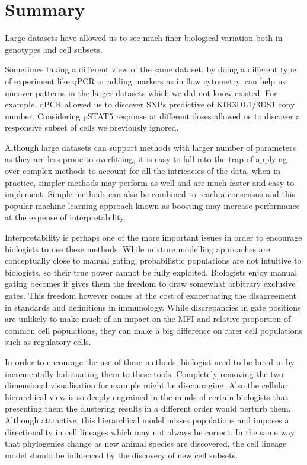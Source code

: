 \section{Summary}

Large datasets have allowed us to see much finer biological variation both in genotypes and cell subsets.

Sometimes taking a different view of the same dataset, by doing a different type of experiment like qPCR or adding markers as in flow cytometry,
can help us uncover patterns in the larger datasets which we did not know existed.
For example, qPCR allowed us to discover SNPs predictive of KIR3DL1/3DS1 copy number.
Considering pSTAT5 response at different doses allowed us to discover a responsive subset of cells we previously ignored.

Although large datasets can support methods with larger number of parameters as they are less prone to overfitting,
it is easy to fall into the trap of applying over complex methods to account for all the intricacies of the data,
when in practice, simpler methods may perform as well and are much faster and easy to implement.
Simple methods can also be combined to reach a consensus and this popular machine learning approach known as boosting
may increase performance at the expense of interpretability.

Interpretability is perhaps one of the more important issues in order to encourage biologists to use these methods.
While mixture modelling approaches are conceptually close to manual gating, probabilistic populations are not intuitive to biologists,
so their true power cannot be fully exploited.
Biologists enjoy manual gating becomes it gives them the freedom to draw somewhat arbitrary exclusive gates.
This freedom however comes at the cost of exacerbating the disagreement in standards and definitions in immunology.
While discrepancies in gate positions are unlikely to make much of an impact on the MFI and relative proportion of common cell populations,
they can make a big difference on rarer cell populations such as regulatory cells.

In order to encourage the use of these methods, biologist need to be lured in by incrementally habituating them to these tools.
Completely removing the two dimensional visualisation for example might be discouraging.
Also the cellular hierarchical view is so deeply engrained in the minds of certain biologists that presenting them the clustering results
in a different order would perturb them.  Although attractive, this hierarchical model misses populations and imposes a directionality
in cell lineages which may not always be correct.  In the same way that phylogenies change as new animal species are discovered,
the cell lineage model should be influenced by the discovery of new cell subsets.

